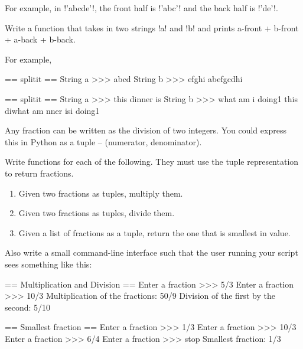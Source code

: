\documentclass[11pt]{cselabheader}
\begin{document}
\begin{ex}[stringfun.py]
\begin{description}
  For example, in \pythoninline!'abcde'!, the front half is \pythoninline!'abc'!
  and the back half is \pythoninline!'de'!. 

  Write a function that takes in two strings \pythoninline!a! and
  \pythoninline!b!  and prints a-front + b-front + a-back + b-back.

  For example,

  \begin{verbatimcode}
== splitit ==
String a >>> abcd
String b >>> efghi
abefgcdhi
  \end{verbatimcode}

  \begin{verbatimcode}
== splitit ==
String a >>> this dinner is
String b >>> what am i doing1
this diwhat am nner isi doing1
  \end{verbatimcode}
\end{description}

\end{ex}

\begin{ex}[fractions.py] Any fraction can be written as the division of two
  integers. You could express this in Python as a tuple -- 
  (numerator, denominator).

  Write functions for each of the following. They must use the tuple
  representation to return fractions.
  \begin{enumerate}
    \item Given two fractions as tuples, multiply them.
    \item Given two fractions as tuples, divide them.
    \item Given a list of fractions as a tuple, return the one that is
      smallest in value.
  \end{enumerate}

  Also write a small command-line interface such that the user running your
  script sees something like this:

  \begin{verbatimcode}
== Multiplication and Division ==
Enter a fraction >>> 5/3
Enter a fraction >>> 10/3
Multiplication of the fractions: 50/9
Division of the first by the second: 5/10

== Smallest fraction ==
Enter a fraction >>> 1/3
Enter a fraction >>> 10/3
Enter a fraction >>> 6/4
Enter a fraction >>> stop
Smallest fraction: 1/3
  \end{verbatimcode}
\end{ex}
\end{document}
